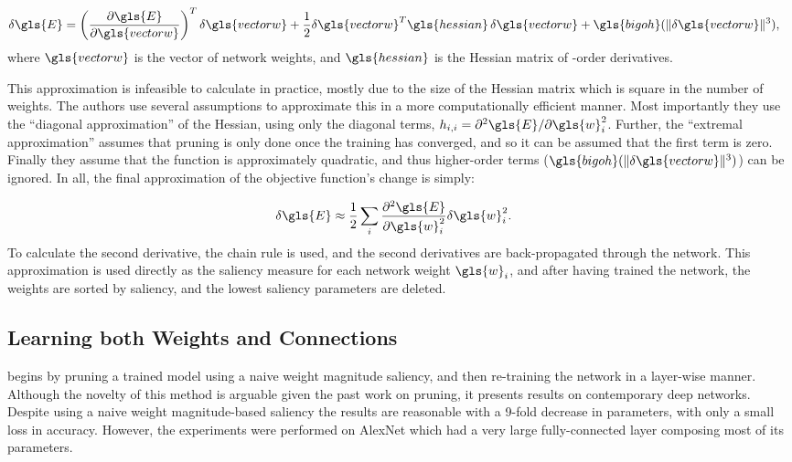 \documentclass[thesis]{subfiles}
\begin{document}
    \begin{align}
       \delta \gls{E} &= \left( \frac{\partial \gls{E}}{\partial \gls{vectorw}} \right)^T \delta \gls{vectorw} +\frac{1}{2}\delta \gls{vectorw}^T \gls{hessian}\, \delta \gls{vectorw} +\gls{bigoh}(\|\delta \gls{vectorw}\|^3),
    \end{align}
	where $\gls{vectorw}$ is the vector of network weights, and %
	$\gls{hessian}$ is the Hessian matrix of -order derivatives. 

    This approximation is infeasible to calculate in practice, mostly due to the size of the Hessian matrix which is square in the number of weights. The authors use several assumptions to approximate this in a more computationally efficient manner. Most importantly they use the ``diagonal approximation'' of the Hessian, using only the diagonal terms, $h_{i,i}=\partial^2 \gls{E} / \partial \gls{w}_i^2$. Further, the ``extremal approximation'' assumes that pruning is only done once the training has converged, and so it can be assumed that the first term is zero. Finally they assume that the function is approximately quadratic, and thus higher-order terms (\ie $\gls{bigoh}(\|\delta \gls{vectorw}\|^3)$) can be ignored. In all, the final approximation of the objective function's change is simply:

    \begin{align}
       \delta \gls{E} &\approx \frac{1}{2} \sum_i \frac{\partial^2 \gls{E}}{\partial \gls{w}_i^2} \delta \gls{w}_i^2.
    \end{align}
    To calculate the second derivative, the chain rule is used, and the second derivatives are back-propagated through the network. This approximation is used directly as the saliency measure for each network weight $\gls{w}_i$, and after having trained the network, the weights are sorted by saliency, and the lowest saliency parameters are deleted.
	
    

	\subsection{Learning both Weights and Connections}
	\citet{han2015learning} begins by pruning a trained model using a naive weight magnitude saliency, and then re-training the network in a layer-wise manner. Although the novelty of this method is arguable given the past work on pruning, it presents results on contemporary deep networks. Despite using a naive weight magnitude-based saliency the results are reasonable with a 9-fold decrease in parameters, with only a small loss in accuracy. However, the experiments were performed on AlexNet which had a very large fully-connected layer composing most of its parameters.
\end{document}
